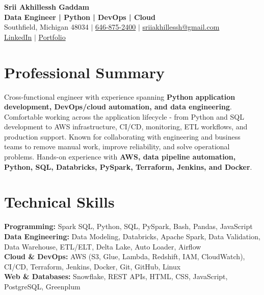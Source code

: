 \documentclass[letterpaper,10pt]{article}
\begin{document}
\fontsize{9.35pt}{10.45pt}\selectfont

\begin{center}
    {\LARGE \textbf{Srii Akhillessh Gaddam}} \\[-1pt]
    \textbf{Data Engineer | Python | DevOps | Cloud} \\[2pt]
    Southfield, Michigan 48034 $|$
    \href{tel:6468752400}{646-875-2400} $|$
    \href{mailto:sriiakhillessh@gmail.com}{sriiakhillessh@gmail.com} \\[1pt]
    \href{https://www.linkedin.com/in/srii-akhiilessh-gaddam-b48668191/}{LinkedIn} $|$
    \href{https://sriiakhillesshg.github.io/portfolio/}{Portfolio}
\end{center}
\vspace{-8pt}

\section{Professional Summary}
\small{Cross-functional engineer with experience spanning \textbf{Python application development, DevOps/cloud automation, and data engineering}. Comfortable working across the application lifecycle - from Python and SQL development to AWS infrastructure, CI/CD, monitoring, ETL workflows, and production support. Known for collaborating with engineering and business teams to remove manual work, improve reliability, and solve operational problems. Hands-on experience with \textbf{AWS, data pipeline automation, Python, SQL, Databricks, PySpark, Terraform, Jenkins, and Docker}.}

\section{Technical Skills}
\small{
\textbf{Programming:} Spark SQL, Python, SQL, PySpark, Bash, Pandas, JavaScript \\
\textbf{Data Engineering:} Data Modeling, Databricks, Apache Spark, Data Validation, Data Warehouse, ETL/ELT, Delta Lake, Auto Loader, Airflow \\
\textbf{Cloud \& DevOps:} AWS (S3, Glue, Lambda, Redshift, IAM, CloudWatch), CI/CD, Terraform, Jenkins, Docker, Git, GitHub, Linux \\
\textbf{Web \& Databases:} Snowflake, REST APIs, HTML, CSS, JavaScript, PostgreSQL, Greenplum
}
\end{document}
